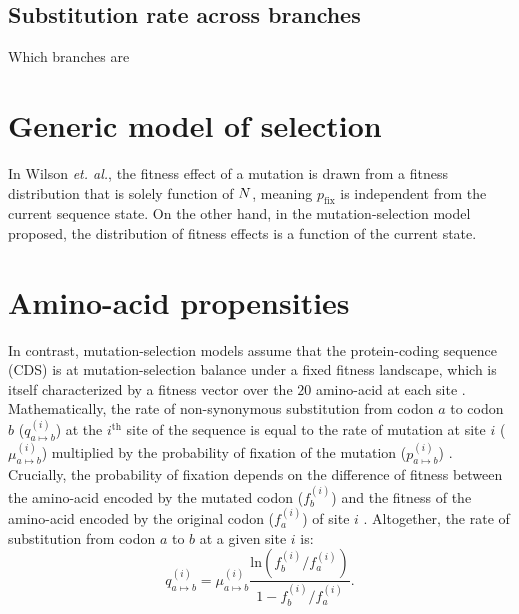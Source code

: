 \subsection{Substitution rate across branches}
Which branches are 


\section{Generic model of selection}

\citet{Welch2008}

In Wilson \textit{et. al.}, the fitness effect of a mutation is drawn from a fitness distribution that is solely function of $N$, meaning ${p_{\mathrm{fix}}}$ is independent from the current sequence state.
On the other hand, in the mutation-selection model proposed, the distribution of fitness effects is a function of the current state.


\section{Amino-acid propensities}

	In contrast, mutation-selection models assume that the protein-coding sequence (CDS) is at mutation-selection balance under a fixed fitness landscape, which is itself characterized by a fitness vector over the $20$ amino-acid at each site \cite{Yang2008, Halpern1998, Rodrigue2010}. Mathematically, the rate of non-synonymous substitution from codon $a$ to codon $b$ ($q_{a \mapsto b}^{(i)}$) at the $i^{\mathrm{th}}$ site of the sequence is equal to the rate of mutation at site $i$ ($\mu_{a \mapsto b}^{(i)}$) multiplied by the probability of fixation of the mutation ($p_{a \mapsto b}^{(i)}$) \cite{kimura_neutral_1983}. Crucially, the probability of fixation depends on the difference of fitness between the amino-acid encoded by the mutated codon ($f_b^{(i)}$) and the fitness of the amino-acid encoded by the original codon ($f_a^{(i)}$) of site $i$ \cite{wright_evolution_1931, fisher_genetical_1930}. Altogether, the rate of substitution from codon $a$ to $b$ at a given site $i$ is:
\begin{equation}
q_{a \mapsto b}^{(i)} = \mu_{a \mapsto b}^{(i)} \dfrac{\mathrm{ln}(f_b^{(i)} / f_a^{(i)})}{1 - f_b^{(i)} / f_a^{(i)}}.
\end{equation}

